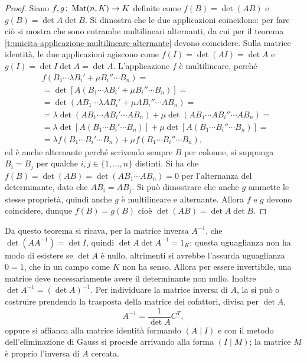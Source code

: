 \begin{proof}
	Siano $f,g\colon\operatorname{Mat}(n,K)\to K$ definite come $f(B)=\det(AB)$ e $g(B)=\det A\det B$.
	Si dimostra che le due applicazioni coincidono: per fare ciò si mostra che sono entrambe multilineari alternanti, da cui per il teorema \ref{t:unicita-applicazione-multilineare-alternante} devono coincidere.
	Sulla matrice identità, le due applicazioni agiscono come $f(I)=\det(AI)=\det A$ e $g(I)=\det I\det A=\det A$.
	L'applicazione $f$ è multilineare, perché
	\begin{align*}
		&f(B_1\cdots\lambda B_i'+\mu B_i''\cdots B_n)=\\
		&=\det[A(B_1\cdots\lambda B_i'+\mu B_i''\cdots B_n)]=\\
		&=\det(AB_1\cdots\lambda AB_i'+\mu AB_i''\cdots AB_n)=\\
		&=\lambda\det(AB_1\cdots AB_i'\cdots AB_n)+\mu\det(AB_1\cdots AB_i''\cdots AB_n)=\\
		&=\lambda\det[A(B_1\cdots B_i'\cdots B_n)]+\mu\det[A(B_1\cdots B_i''\cdots B_n)]=\\
		&=\lambda f(B_1\cdots B_i'\cdots B_n)+\mu f(B_1\cdots B_i''\cdots B_n),
	\end{align*}
	ed è anche alternante perché scrivendo sempre $B$ per colonne, si supponga $B_i=B_j$ per qualche $i,j\in\{1,\dots,n\}$ distinti.
	Si ha che $f(B)=\det(AB)=\det(AB_1\cdots AB_n)=0$ per l'alternanza del determinante, dato che $AB_i=AB_j$.
	Si può dimostrare che anche $g$ ammette le stesse proprietà, quindi anche $g$ è multilineare e alternante.
	Allora $f$ e $g$ devono coincidere, dunque $f(B)=g(B)$ cioè $\det(AB)=\det A\det B$.
\end{proof}
Da questo teorema si ricava, per la matrice inversa $A^{-1}$, che $\det(AA^{-1})=\det I$, quindi $\det A\det A^{-1}=1_K$: questa uguaglianza non ha modo di esistere se $\det A$ è nullo, altrimenti si avrebbe l'assurda uguaglianza $0=1$, che in un campo come $K$ non ha senso.
Allora per essere invertibile, una matrice deve necessariamente avere il determinante non nullo.
Inoltre $\det A^{-1}=(\det A)^{-1}$.
Per individuare la matrice inversa di $A$, la si può o costruire prendendo la trasposta della matrice dei cofattori, divisa per $\det A$,
\begin{equation*}
	A^{-1}=\frac1{\det A}C^T,
\end{equation*}
oppure si affianca alla matrice identità formando $(A\mid I)$ e con il metodo dell'eliminazione di Gauss si procede arrivando alla forma $(I\mid M)$; la matrice $M$ è proprio l'inversa di $A$ cercata.
